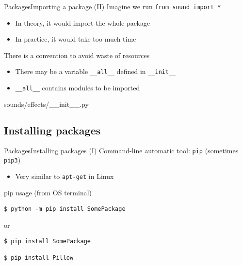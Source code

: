 \documentclass[10pt,compress]{beamer} %
\begin{document}
\begin{frame}{Packages}{Importing a package (II)}
	Imagine we run \texttt{from sound import *}
		\begin{itemize}
		\item In theory, it would import the whole package
		\item In practice, it would take too much time
		\end{itemize}
	There is a convention to avoid waste of resources
		\begin{itemize}
		\item There may be a variable \texttt{\_\_all\_\_} defined in \texttt{\_\_init\_\_}
		\item \texttt{\_\_all\_\_} contains modules to be imported
		\end{itemize}

	\begin{exampleblock}{sounds/effects/\_\_init\_\_.py}
	\vspace{-0.2cm}
	
	\vspace{-0.2cm}
	\end{exampleblock}
\end{frame}

\subsection{Installing packages}
\begin{frame}[fragile]{Packages}{Installing packages (I)}
	Command-line automatic tool: \texttt{pip} (sometimes \texttt{pip3})
		\begin{itemize}
			\item Very similar to \texttt{apt-get} in Linux
		\end{itemize}

	\begin{block}{pip usage (from OS terminal)}
	\vspace{-0.2cm}
	\begin{verbatim}
$ python -m pip install SomePackage
\end{verbatim}
or
	\begin{verbatim}
$ pip install SomePackage
\end{verbatim}
	\vspace{-0.2cm}
\end{block}

	\begin{exampleblock}{}
	\vspace{-0.2cm}
	\begin{verbatim}
$ pip install Pillow
\end{verbatim}
	\vspace{-0.2cm}
\end{exampleblock}
\end{frame}
\end{document}
